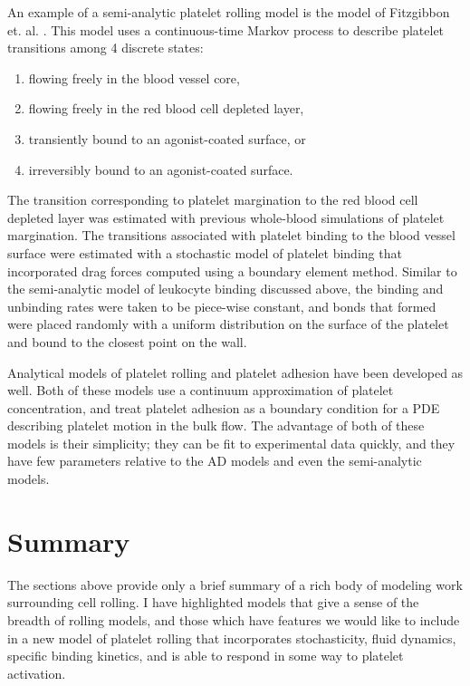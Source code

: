 An example of a semi-analytic platelet rolling model is the model of
Fitzgibbon et. al. \cite{Fitzgibbon2014}. This model uses a
continuous-time Markov process to describe platelet transitions among
4 discrete states:
\begin{enumerate}
\item flowing freely in the blood vessel core,
\item flowing freely in the red blood cell depleted layer,
\item transiently bound to an agonist-coated surface, or
\item irreversibly bound to an agonist-coated surface.
\end{enumerate}
The transition corresponding to platelet margination to the red blood
cell depleted layer was estimated with previous whole-blood
simulations of platelet margination. The transitions associated with
platelet binding to the blood vessel surface were estimated with a
stochastic model of platelet binding that incorporated drag forces
computed using a boundary element method. Similar to the semi-analytic
model of leukocyte \cite{Tozeren1992} binding discussed above, the
binding and unbinding rates were taken to be piece-wise constant, and
bonds that formed were placed randomly with a uniform distribution on
the surface of the platelet and bound to the closest point on the
wall.

Analytical models of platelet rolling \cite{Pujos2018} and platelet
adhesion \cite{Tokarev2011} have been developed as well. Both of these
models use a continuum approximation of platelet concentration, and
treat platelet adhesion as a boundary condition for a PDE describing
platelet motion in the bulk flow. The advantage of both of these
models is their simplicity; they can be fit to experimental data
quickly, and they have few parameters relative to the AD models and
even the semi-analytic models.

\section{Summary}
\label{sec:summary-background}

The sections above provide only a brief summary of a rich body of
modeling work surrounding cell rolling. I have highlighted models that
give a sense of the breadth of rolling models, and those which have
features we would like to include in a new model of platelet rolling
that incorporates stochasticity, fluid dynamics, specific binding
kinetics, and is able to respond in some way to platelet activation.


